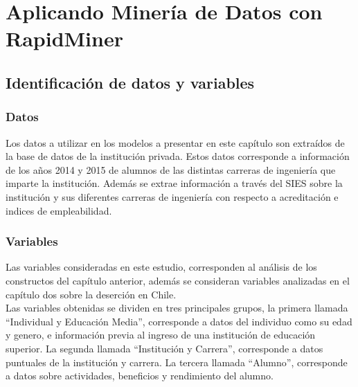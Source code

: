 \chapter[Aplicando Minería de Datos con RapidMiner]{Aplicando Minería de Datos con RapidMiner}
\label{ch:desmin}

\section{Identificación de datos y variables}
\subsection{Datos}

Los datos a utilizar en los modelos a presentar en este capítulo son extraídos de la base de datos de la institución privada. Estos datos corresponde a información de los años 2014 y 2015 de alumnos de las distintas carreras de ingeniería que imparte la institución. Además se extrae información a través del SIES sobre la institución y sus diferentes carreras de ingeniería con respecto a acreditación e indices de empleabilidad.\\

\subsection{Variables}

Las variables consideradas en este estudio, corresponden al análisis de los constructos del capítulo anterior, además se consideran variables analizadas en el capítulo dos sobre la deserción en Chile.\\

Las variables obtenidas se dividen en tres principales grupos, la primera llamada ``Individual y Educación Media'', corresponde a datos del individuo como su edad y genero, e información previa al ingreso de una institución de educación superior. La segunda llamada ``Institución y Carrera'', corresponde a datos puntuales de la institución y carrera. La tercera llamada ``Alumno'', corresponde a datos sobre actividades, beneficios y rendimiento del alumno.\\



